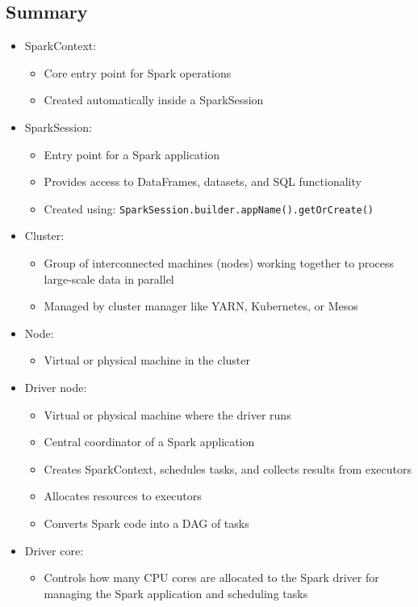 \documentclass[11pt]{scrartcl}
\begin{document}
\newpage
\subsection{Summary}
\begin{itemize}
	\item SparkContext:
	\begin{itemize}
		\item Core entry point for Spark operations
		\item Created automatically inside a SparkSession
	\end{itemize}
	\item SparkSession:
	\begin{itemize}
		\item Entry point for a Spark application
		\item Provides access to DataFrames, datasets, and SQL functionality
		\item Created using: \texttt{SparkSession.builder.appName().getOrCreate()}
	\end{itemize}
	\item Cluster:
	\begin{itemize}
		\item Group of interconnected machines (nodes) working together to process large-scale data in parallel
		\item Managed by cluster manager like YARN, Kubernetes, or Mesos
	\end{itemize}
	\item Node: 
	\begin{itemize}
		\item Virtual or physical machine in the cluster
	\end{itemize}
	\item Driver node:
	\begin{itemize}
		\item Virtual or physical machine where the driver runs
		\item Central coordinator of a Spark application
		\item Creates SparkContext, schedules tasks, and collects results from executors
		\item Allocates resources to executors
		\item Converts Spark code into a DAG of tasks
	\end{itemize}
	\item Driver core:
	\begin{itemize}
		\item Controls how many CPU cores are allocated to the Spark driver for managing the Spark application and scheduling tasks

\end{itemize}
\end{itemize}
\end{document}
